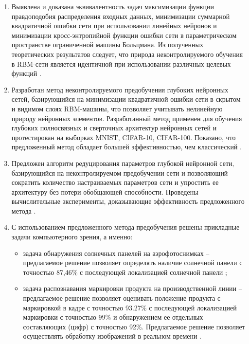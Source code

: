 \begin{enumerate}[wide, labelindent=10mm]

\item Выявлена и доказана эквивалентность задач максимизации функции правдоподобия распределения входных данных, минимизации суммарной квадратичной ошибки сети при использовании линейных нейронов и минимизации кросс-энтропийной функции ошибки сети в параметрическом пространстве ограниченной машины Больцмана. Из полученных теоретических результатов следует, что природа неконтролируемого обучения в RBM-сети является идентичной при использовании различных целевых функций \cite{2-A, 4-A, 5-A, 10-A, 3-A, 12-A, 13-A}.
\item Разработан метод неконтролируемого предобучения глубоких нейронных сетей, базирующийся на минимизации квадратичной ошибки сети в скрытом и видимом слоях RBM-машины, что позволяет учитывать нелинейную природу нейронных элементов. Разработанный метод применен для обучения глубоких полносвязных и сверточных архитектур нейронных сетей и протестирован на выборках MNIST, CIFAR-10, CIFAR-100. Показано, что предложенный метод обладает большей эффективностью, чем классический \cite{2-A, 4-A, 5-A, 10-A, 3-A, 1-A, 19-A, 12-A, 20-A, 13-A, 17-A, 18-A, 21-A, 22-A}.
\item Предложен алгоритм редуцирования параметров глубокой нейронной сети, базирующийся на неконтролируемом предобучении сети и позволяющий сократить количество настраиваемых параметров сети и упростить ее архитектуру без потери обобщающей способности. Проведены вычислительные эксперименты, доказывающие эффективность предложенного метода \cite{11-A, 30-A, 16-A}.
\item С использованием предложенного метода предобучения решены прикладные задачи компьютерного зрения, а именно: 

    \begin{itemize}
        \item задача обнаружения солнечных панелей на аэрофотоснимках -- предлагаемое решение позволяет определять наличие солнечной панели с точностью 87,46\% с последующей локализацией солнечной панели \cite{9-A, 14-A, 15-A};
        \item задача распознавания маркировки продукта на производственной линии -- предлагаемое решение позволяет оценивать положение продукта с маркировкой в кадре с точностью 93.27\% с последующей локализацией маркировки с точностью 99\% и обнаружением ее отдельных составляющих (цифр) с точностью 92\%. Предлагаемое решение позволяет осуществлять обработку изображений в реальном времени \cite{7-A, 29-A, 6-A, 25-A, 27-A, 23-A, 24-A, 8-A, 26-A, 28-A}.
    \end{itemize}


\end{enumerate}
